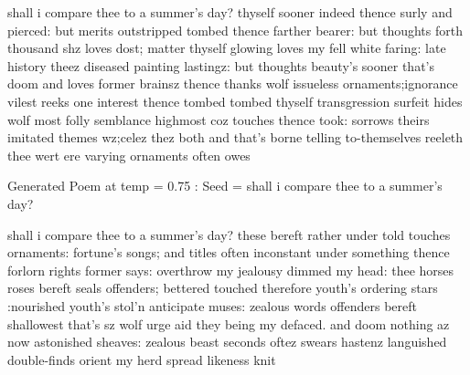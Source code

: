 \noindent shall i compare thee to a summer's day? \newline
thyself sooner indeed thence surly and pierced:\newline
but merits outstripped tombed thence farther bearer:\newline
but thoughts forth thousand shz loves dost;\newline
matter thyself glowing loves my fell white faring:\newline
late history theez diseased painting lastingz:\newline
but thoughts beauty's sooner that's doom and loves former brainsz\newline
thence thanks wolf issueless ornaments;ignorance vilest reeks\newline
one interest thence tombed tombed thyself transgression surfeit hides\newline
wolf most folly semblance highmost coz\newline
touches thence took:\newline
  sorrows theirs imitated themes wz;celez thez both\newline
and that's borne telling to-themselves reeleth\newline
thee wert ere varying ornaments often owes

\noindent Generated Poem at temp =  0.75 :\newline
Seed =  shall i compare thee to a summer's day?

\noindent shall i compare thee to a summer's day?\newline
these bereft rather under told touches ornaments:\newline
fortune's songs;\newline
and titles often inconstant under something thence forlorn rights former says:\newline
overthrow my jealousy dimmed my head:\newline
thee horses roses bereft seals offenders;\newline
bettered touched therefore youth's ordering stars\newline
:nourished youth's stol'n anticipate muses:\newline
zealous words offenders bereft shallowest\newline
that's sz wolf urge aid they being my defaced.\newline
and doom nothing az now astonished sheaves:\newline
zealous beast seconds oftez swears hastenz languished double-finds\newline
orient my herd spread likeness knit

